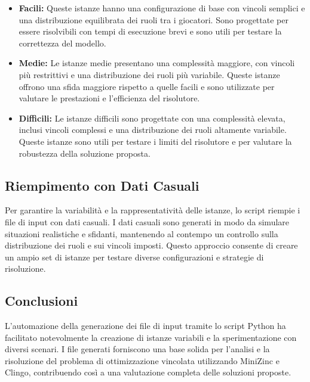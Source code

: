 \documentclass{article}
\begin{document}
\begin{multicols*}{2}
\begin{itemize}
    \item \textbf{Facili:} Queste istanze hanno una configurazione di base con vincoli semplici e una distribuzione equilibrata dei ruoli tra i giocatori. Sono progettate per essere risolvibili con tempi di esecuzione brevi e sono utili per testare la correttezza del modello.
    \item \textbf{Medie:} Le istanze medie presentano una complessità maggiore, con vincoli più restrittivi e una distribuzione dei ruoli più variabile. Queste istanze offrono una sfida maggiore rispetto a quelle facili e sono utilizzate per valutare le prestazioni e l'efficienza del risolutore.
    \item \textbf{Difficili:} Le istanze difficili sono progettate con una complessità elevata, inclusi vincoli complessi e una distribuzione dei ruoli altamente variabile. Queste istanze sono utili per testare i limiti del risolutore e per valutare la robustezza della soluzione proposta.
\end{itemize}

\subsection{Riempimento con Dati Casuali}

Per garantire la variabilità e la rappresentatività delle istanze, lo script riempie i file di input con dati casuali. I dati casuali sono generati in modo da simulare situazioni realistiche e sfidanti, mantenendo al contempo un controllo sulla distribuzione dei ruoli e sui vincoli imposti. Questo approccio consente di creare un ampio set di istanze per testare diverse configurazioni e strategie di risoluzione.

\subsection{Conclusioni}

L'automazione della generazione dei file di input tramite lo script Python ha facilitato notevolmente la creazione di istanze variabili e la sperimentazione con diversi scenari. I file generati forniscono una base solida per l'analisi e la risoluzione del problema di ottimizzazione vincolata utilizzando MiniZinc e Clingo, contribuendo così a una valutazione completa delle soluzioni proposte.


\end{multicols*}
\end{document}
